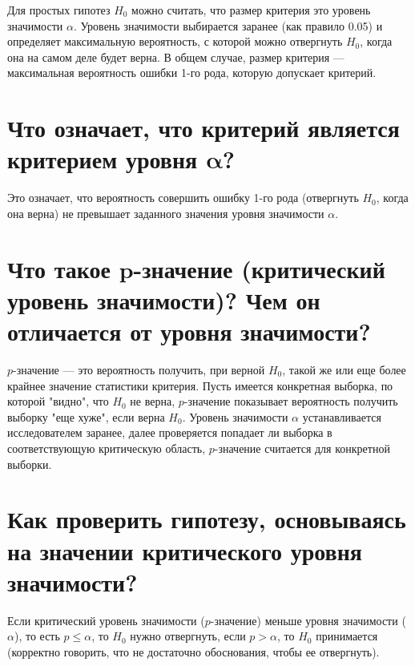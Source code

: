 \documentclass{article}
\begin{document}
Для простых гипотез $H_0$ можно считать, что размер критерия это уровень значимости $\alpha$. Уровень значимости выбирается заранее (как правило 0.05) и определяет максимальную вероятность, с которой можно отвергнуть $H_0$, когда она на самом деле будет верна. В общем случае, размер критерия --- максимальная вероятность ошибки 1-го рода, которую допускает критерий.


\section{Что означает, что критерий является критерием уровня $\bm\alpha$?}

Это означает, что вероятность совершить ошибку 1-го рода (отвергнуть $H_0$, когда она верна) не превышает заданного значения уровня значимости $\alpha$.


\section{Что такое $\bm p$-значение (критический уровень значимости)? Чем он отличается от уровня значимости?}

$p$-значение --- это вероятность получить, при верной $H_0$, такой же или еще более крайнее значение статистики критерия. Пусть имеется конкретная выборка, по которой "видно", что $H_0$ не верна, $p$-значение показывает вероятность получить выборку "еще хуже", если верна $H_0$. Уровень значимости $\alpha$ устанавливается исследователем заранее, далее проверяется попадает ли выборка в соответствующую критическую область, $p$-значение считается для конкретной выборки.


\section{Как проверить гипотезу, основываясь на значении критического уровня значимости?}

Если критический уровень значимости ($p$-значение) меньше уровня значимости ($\alpha$), то есть $p\leq\alpha$, то $H_0$ нужно отвергнуть, если $p>\alpha$, то $H_0$ принимается (корректно говорить, что не достаточно обоснования, чтобы ее отвергнуть).
\end{document}

